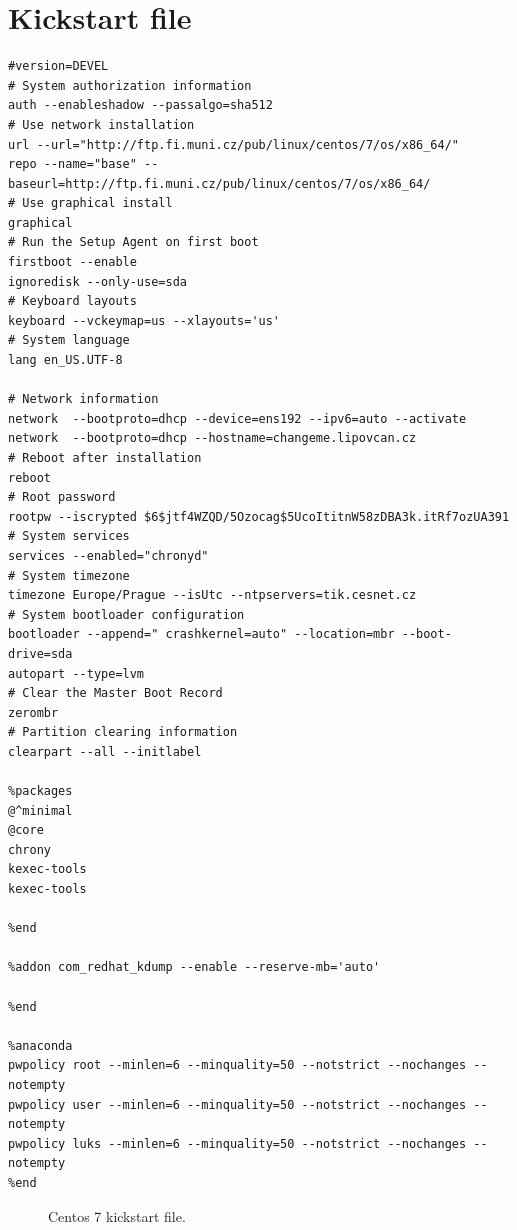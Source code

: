 \documentclass[
  printed, %
  table,   %
  nolof,     %
  nolot,     %
           oneside, color
]{fithesis3}
\newcommand{\appendices}[1]{\addcontentsline{apc}{appendices}{#1}}
\newcommand{\newappendix}[1]{\chapter{#1}\appendices{#1}}
\begin{document}
\newappendix{Kickstart file}
\label{kickstart}
\begin{lstlisting}
#version=DEVEL
# System authorization information
auth --enableshadow --passalgo=sha512
# Use network installation
url --url="http://ftp.fi.muni.cz/pub/linux/centos/7/os/x86_64/"
repo --name="base" --baseurl=http://ftp.fi.muni.cz/pub/linux/centos/7/os/x86_64/
# Use graphical install
graphical
# Run the Setup Agent on first boot
firstboot --enable
ignoredisk --only-use=sda
# Keyboard layouts
keyboard --vckeymap=us --xlayouts='us'
# System language
lang en_US.UTF-8

# Network information
network  --bootproto=dhcp --device=ens192 --ipv6=auto --activate
network  --bootproto=dhcp --hostname=changeme.lipovcan.cz
# Reboot after installation
reboot
# Root password
rootpw --iscrypted $6$jtf4WZQD/5Ozocag$5UcoItitnW58zDBA3k.itRf7ozUA391
# System services
services --enabled="chronyd"
# System timezone
timezone Europe/Prague --isUtc --ntpservers=tik.cesnet.cz
# System bootloader configuration
bootloader --append=" crashkernel=auto" --location=mbr --boot-drive=sda
autopart --type=lvm
# Clear the Master Boot Record
zerombr
# Partition clearing information
clearpart --all --initlabel

%packages
@^minimal
@core
chrony
kexec-tools
kexec-tools

%end

%addon com_redhat_kdump --enable --reserve-mb='auto'

%end

%anaconda
pwpolicy root --minlen=6 --minquality=50 --notstrict --nochanges --notempty
pwpolicy user --minlen=6 --minquality=50 --notstrict --nochanges --notempty
pwpolicy luks --minlen=6 --minquality=50 --notstrict --nochanges --notempty
%end
\end{lstlisting}

\begin{figure}[H]
\center
\caption{Centos 7 kickstart file.}
\label{fig:kickstart}
\end{figure}


\end{document}
